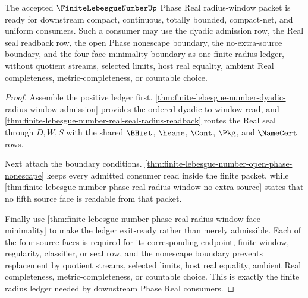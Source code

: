 \begin{theorem}
\label{thm:finite-lebesgue-number-phase-real-radius-window-exit-consumer-readiness}
The accepted $\FiniteLebesgueNumberUp$ Phase Real radius-window packet is ready for downstream compact, continuous, totally bounded, compact-net, and uniform consumers. Such a consumer may use the dyadic admission row, the Real seal readback row, the open Phase nonescape boundary, the no-extra-source boundary, and the four-face minimality boundary as one finite radius ledger, without quotient streams, selected limits, host real equality, ambient Real completeness, metric-completeness, or countable choice.
\end{theorem}
\begin{proof}
Assemble the positive ledger first. \autoref{thm:finite-lebesgue-number-dyadic-radius-window-admission} provides the ordered dyadic-to-window read, and \autoref{thm:finite-lebesgue-number-real-seal-radius-readback} routes the Real seal through $D,W,S$ with the shared $\BHist$, $\hsame$, $\Cont$, $\Pkg$, and $\NameCert$ rows.

Next attach the boundary conditions. \autoref{thm:finite-lebesgue-number-open-phase-nonescape} keeps every admitted consumer read inside the finite packet, while \autoref{thm:finite-lebesgue-number-phase-real-radius-window-no-extra-source} states that no fifth source face is readable from that packet.

Finally use \autoref{thm:finite-lebesgue-number-phase-real-radius-window-face-minimality} to make the ledger exit-ready rather than merely admissible. Each of the four source faces is required for its corresponding endpoint, finite-window, regularity, classifier, or seal row, and the nonescape boundary prevents replacement by quotient streams, selected limits, host real equality, ambient Real completeness, metric-completeness, or countable choice. This is exactly the finite radius ledger needed by downstream Phase Real consumers.
\end{proof}

